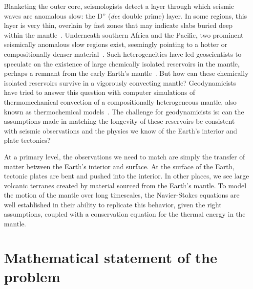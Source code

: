 Blanketing the outer core, seismologists detect a layer through which
seismic waves are anomalous slow: the D'' (\emph{dee} double prime)
layer.  In some regions, this layer is very thin, overlain by fast
zones that may indicate slabs buried deep within the
mantle~\citep{McNamaraZhong2005}.  Underneath southern Africa and the
Pacific, two prominent seismically anomalous slow regions exist,
seemingly pointing to a hotter or compositionally denser
material~\citep{McNutt1998}. Such heterogeneities have led
geoscientists to speculate on the existence of large chemically
isolated reservoirs in the mantle, perhaps a remnant from the early
Earth's mantle~\citep{Burke2008}.  But how can these chemically
isolated reservoirs survive in a vigorously convecting mantle?
Geodynamicists have tried to answer this question with computer
simulations of thermomechanical convection of a compositionally
heterogeneous mantle, also known as thermochemical
models~\citep{McNamara2010}. The challenge for geodynamicists is: can
the assumptions made in matching the longevity of these reservoirs be
consistent with seismic observations and the physics we know of the
Earth's interior and plate tectonics?

At a primary level, the observations we need to match are simply the
transfer of matter between the Earth's interior and surface. At the
surface of the Earth, tectonic plates are bent and pushed into the
interior. In other places, we see large volcanic terranes created by
material sourced from the Earth's mantle. To model the motion of the
mantle over long timescales, the Navier-Stokes equations are well
established in their ability to replicate this behavior, given the
right assumptions, coupled with a conservation equation for the
thermal energy in the mantle.


\section{Mathematical statement of the problem}
\label{vynnytska:sec:maths}

